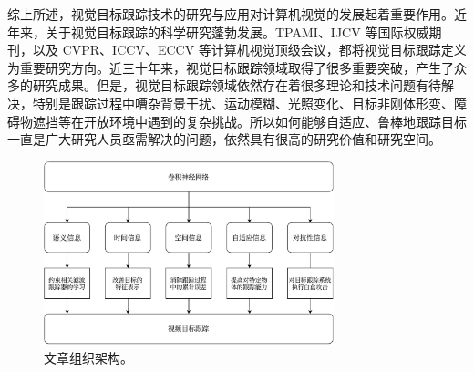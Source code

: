 综上所述，视觉目标跟踪技术的研究与应用对计算机视觉的发展起着重要作用。近年来，关于视觉目标跟踪的科学研究蓬勃发展。TPAMI、IJCV 等国际权威期刊，以及 CVPR、ICCV、ECCV 等计算机视觉顶级会议，都将视觉目标跟踪定义为重要研究方向。近三十年来，视觉目标跟踪领域取得了很多重要突破，产生了众多的研究成果。但是，视觉目标跟踪领域依然存在着很多理论和技术问题有待解决，特别是跟踪过程中嘈杂背景干扰、运动模糊、光照变化、目标非刚体形变、障碍物遮挡等在开放环境中遇到的复杂挑战。所以如何能够自适应、鲁棒地跟踪目标一直是广大研究人员亟需解决的问题，依然具有很高的研究价值和研究空间。

\begin{figure}
\centering
\includegraphics[width=0.75\textwidth]{Img/paper_arch.pdf}
\caption{文章组织架构。}
\end{figure}

